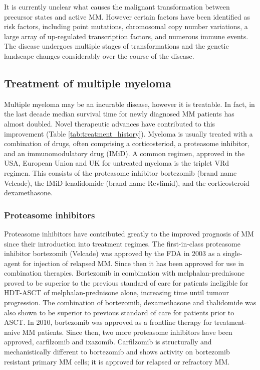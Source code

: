 It is currently unclear what causes the malignant transformation between precursor states and active MM\@.
However certain factors have been identified as risk factors, including point mutations, chromosomal copy number variations, a large array of up-regulated transcription factors, and numerous immune events.
The disease undergoes multiple stages of transformations and the genetic landscape changes considerably over the course of the disease.

\subsection{Treatment of multiple myeloma}\label{subsec:mm_treatment}
Multiple myeloma may be an incurable disease, however it is treatable.
In fact, in the last decade median survival time for newly diagnosed MM patients has almost doubled\cite{kazandjian2016look}.
Novel therapeutic advances have contributed to this improvement (Table \ref{tab:treatment_history}).
Myeloma is usually treated with a combination of drugs, often comprising a corticosteriod, a proteasome inhibitor, and an immunomodulatory drug (IMiD).
A common regimen, approved in the USA, European Union and UK for untreated myeloma is the triplet VRd regimen.
This consists of the proteasome inhibitor bortezomib (brand name Velcade), the IMiD lenalidomide (brand name Revlimid), and the corticosteroid dexamethasone.



\subsubsection{Proteasome inhibitors}
Proteasome inhibitors have contributed greatly to the improved prognosis of MM since their introduction into treatment regimes.
The first-in-class proteasome inhibitor bortezomib (Velcade\textsuperscript{\textregistered}) was approved by the FDA in 2003 as a single-agent for injection of relapsed MM\cite{kane2003velcade}.
Since then it has been approved for use in combination therapies.
Bortezomib in combination with melphalan-prednisone proved to be superior to the previous standard of care for patients ineligible for HDT-ASCT of melphalan-prednisone alone, increasing time until tumour progression\cite{san2008bortezomib}.
The combination of bortezomib, dexamethasone and thalidomide  was also shown to be superior to previous standard of care for patients prior to ASCT\cite{moreau2012proteasome}.
In 2010, bortezomib was approved as a frontline therapy for treatment-naive MM patients.
Since then, two more proteasome inhibitors have been approved, carfilzomib and ixazomib.
Carfilzomib is structurally and mechanistically different to bortezomib and shows activity on bortezomib resistant primary MM cells\cite{moreau2012proteasome}; it is approved for relapsed or refractory MM\@.

